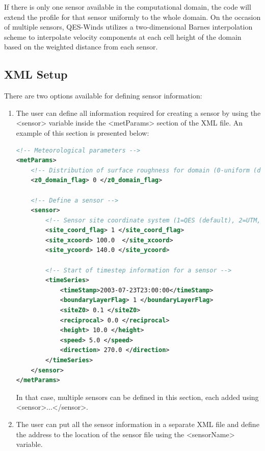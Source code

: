 If there is only one sensor available in the computational domain, the code will extend the profile for that sensor uniformly to the whole domain. On the occasion of multiple sensors, QES-Winds utilizes a two-dimensional Barnes interpolation scheme \cite{koch1983interactive,booth2012validation} to interpolate velocity components at each cell height of the domain based on the weighted distance from each sensor.



\subsection{XML Setup}
\label{sec:sensor_xml}

There are two options available for defining sensor information:

\begin{enumerate}

\item The user can define all information required for creating a sensor by using the <sensor> variable inside the <metParams> section of the XML file. An example of this section is presented below: 

\begin{lstlisting}[language=XML]
<!-- Meteorological parameters -->
<metParams>
	<!-- Distribution of surface roughness for domain (0-uniform (default), 1-custom -->
	<z0_domain_flag> 0 </z0_domain_flag>           			
  	
  	<!-- Define a sensor -->  
	<sensor>
		<!-- Sensor site coordinate system (1=QES (default), 2=UTM, 3=Lat/Lon) -->    	
		<site_coord_flag> 1 </site_coord_flag> 			
		<site_xcoord> 100.0  </site_xcoord> 		
		<site_ycoord> 140.0 </site_ycoord> 
		
		<!-- Start of timestep information for a sensor -->
		<timeSeries>			
			<timeStamp>2003-07-23T23:00:00</timeStamp>					
			<boundaryLayerFlag> 1 </boundaryLayerFlag> 	
			<siteZ0> 0.1 </siteZ0> 			
			<reciprocal> 0.0 </reciprocal> 	
			<height> 10.0 </height> 		
			<speed> 5.0 </speed> 			
			<direction> 270.0 </direction> 	
		</timeSeries>
	</sensor>
</metParams>	
\end{lstlisting}
In that case, multiple sensors can be defined in this section, each added using <sensor>...</sensor>.

\item The user can put all the sensor information in a separate XML file and define the address to the location of the sensor file using the <sensorName> variable.


\end{enumerate}
